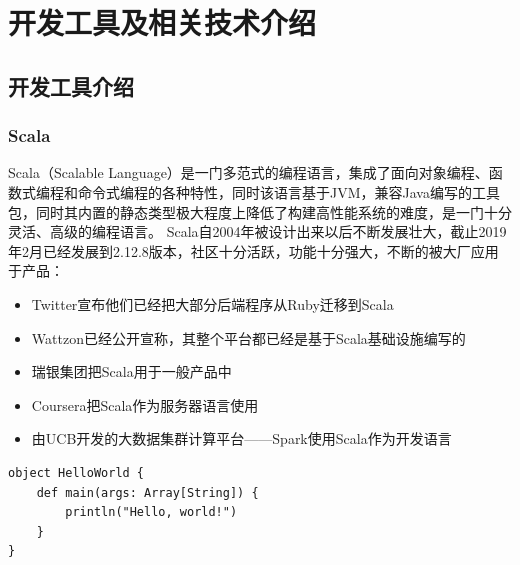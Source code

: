\chapter{开发工具及相关技术介绍}

\section{开发工具介绍}
    \subsection{Scala}
        Scala（Scalable Language）是一门多范式的编程语言，集成了面向对象编程、函数式编程和命令式编程的各种特性，同时该语言基于JVM，兼容Java编写的工具包，同时其内置的静态类型极大程度上降低了构建高性能系统的难度，是一门十分灵活、高级的编程语言。
        Scala自2004年被设计出来以后不断发展壮大，截止2019年2月已经发展到2.12.8版本，社区十分活跃，功能十分强大，不断的被大厂应用于产品：
        \begin{itemize}[topsep = 0 pt]
            \setlength{\topsep}{0pt}
            \setlength{\itemsep}{0pt}
            \setlength{\parsep}{0pt}
            \setlength{\parskip}{0pt}
            \setlength{\partopsep}{0pt}
            \item  Twitter宣布他们已经把大部分后端程序从Ruby迁移到Scala
            \item  Wattzon已经公开宣称，其整个平台都已经是基于Scala基础设施编写的
            \item  瑞银集团把Scala用于一般产品中
            \item  Coursera把Scala作为服务器语言使用
            \item  由UCB开发的大数据集群计算平台——Spark使用Scala作为开发语言
        \end{itemize}       
        \begin{lstlisting}[title=Scala Hello world, frame=shadowbox]
object HelloWorld {
    def main(args: Array[String]) {
        println("Hello, world!")
    }
}
        \end{lstlisting}

